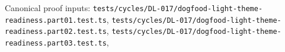 \begin{itemize}
  Canonical proof inputs: \texttt{t\allowbreak{}e\allowbreak{}s\allowbreak{}t\allowbreak{}s\allowbreak{}/\allowbreak{}c\allowbreak{}y\allowbreak{}c\allowbreak{}l\allowbreak{}e\allowbreak{}s\allowbreak{}/\allowbreak{}D\allowbreak{}L\allowbreak{}-\allowbreak{}0\allowbreak{}1\allowbreak{}7\allowbreak{}/\allowbreak{}d\allowbreak{}o\allowbreak{}g\allowbreak{}f\allowbreak{}o\allowbreak{}o\allowbreak{}d\allowbreak{}-\allowbreak{}l\allowbreak{}i\allowbreak{}g\allowbreak{}h\allowbreak{}t\allowbreak{}-\allowbreak{}t\allowbreak{}h\allowbreak{}e\allowbreak{}m\allowbreak{}e\allowbreak{}-\allowbreak{}r\allowbreak{}e\allowbreak{}a\allowbreak{}d\allowbreak{}i\allowbreak{}n\allowbreak{}e\allowbreak{}s\allowbreak{}s\allowbreak{}.\allowbreak{}p\allowbreak{}a\allowbreak{}r\allowbreak{}t\allowbreak{}0\allowbreak{}1\allowbreak{}.\allowbreak{}t\allowbreak{}e\allowbreak{}s\allowbreak{}t\allowbreak{}.\allowbreak{}t\allowbreak{}s}, \texttt{t\allowbreak{}e\allowbreak{}s\allowbreak{}t\allowbreak{}s\allowbreak{}/\allowbreak{}c\allowbreak{}y\allowbreak{}c\allowbreak{}l\allowbreak{}e\allowbreak{}s\allowbreak{}/\allowbreak{}D\allowbreak{}L\allowbreak{}-\allowbreak{}0\allowbreak{}1\allowbreak{}7\allowbreak{}/\allowbreak{}d\allowbreak{}o\allowbreak{}g\allowbreak{}f\allowbreak{}o\allowbreak{}o\allowbreak{}d\allowbreak{}-\allowbreak{}l\allowbreak{}i\allowbreak{}g\allowbreak{}h\allowbreak{}t\allowbreak{}-\allowbreak{}t\allowbreak{}h\allowbreak{}e\allowbreak{}m\allowbreak{}e\allowbreak{}-\allowbreak{}r\allowbreak{}e\allowbreak{}a\allowbreak{}d\allowbreak{}i\allowbreak{}n\allowbreak{}e\allowbreak{}s\allowbreak{}s\allowbreak{}.\allowbreak{}p\allowbreak{}a\allowbreak{}r\allowbreak{}t\allowbreak{}0\allowbreak{}2\allowbreak{}.\allowbreak{}t\allowbreak{}e\allowbreak{}s\allowbreak{}t\allowbreak{}.\allowbreak{}t\allowbreak{}s}, \texttt{t\allowbreak{}e\allowbreak{}s\allowbreak{}t\allowbreak{}s\allowbreak{}/\allowbreak{}c\allowbreak{}y\allowbreak{}c\allowbreak{}l\allowbreak{}e\allowbreak{}s\allowbreak{}/\allowbreak{}D\allowbreak{}L\allowbreak{}-\allowbreak{}0\allowbreak{}1\allowbreak{}7\allowbreak{}/\allowbreak{}d\allowbreak{}o\allowbreak{}g\allowbreak{}f\allowbreak{}o\allowbreak{}o\allowbreak{}d\allowbreak{}-\allowbreak{}l\allowbreak{}i\allowbreak{}g\allowbreak{}h\allowbreak{}t\allowbreak{}-\allowbreak{}t\allowbreak{}h\allowbreak{}e\allowbreak{}m\allowbreak{}e\allowbreak{}-\allowbreak{}r\allowbreak{}e\allowbreak{}a\allowbreak{}d\allowbreak{}i\allowbreak{}n\allowbreak{}e\allowbreak{}s\allowbreak{}s\allowbreak{}.\allowbreak{}p\allowbreak{}a\allowbreak{}r\allowbreak{}t\allowbreak{}0\allowbreak{}3\allowbreak{}.\allowbreak{}t\allowbreak{}e\allowbreak{}s\allowbreak{}t\allowbreak{}.\allowbreak{}t\allowbreak{}s}, 
\end{itemize}
